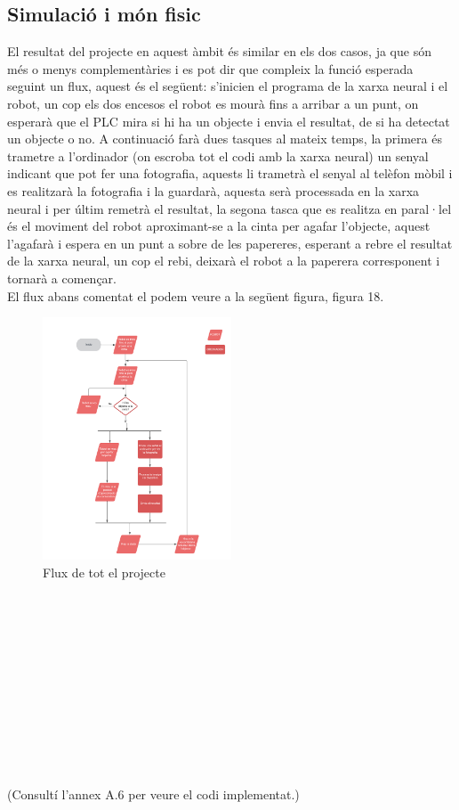 ﻿\documentclass[10pt,a4paper,twocolumn,twoside]{article}
\begin{document}
\subsection{Simulació i món fisic}

El resultat del projecte en aquest àmbit és similar en els dos casos, ja que són més o menys complementàries i es pot dir que compleix la funció esperada seguint un flux, aquest és el següent: s'inicien el programa de la xarxa neural i el robot, un cop els dos encesos el robot es mourà fins a arribar a un punt, on esperarà que el PLC mira si hi ha un objecte i envia el resultat, de si ha detectat un objecte o no. A continuació farà dues tasques al mateix temps, la primera és trametre a l'ordinador (on escroba tot el codi amb la xarxa neural) un senyal indicant que pot fer una fotografia, aquests li trametrà el senyal al telèfon mòbil i es realitzarà la fotografia i la guardarà, aquesta serà processada en la xarxa neural i per últim remetrà el resultat, la segona tasca que es realitza en paral·lel és el moviment del robot aproximant-se a la cinta per agafar l'objecte, aquest l'agafarà i espera en un punt a sobre de les papereres, esperant a rebre el resultat de la xarxa neural, un cop el rebi, deixarà el robot a la paperera corresponent i tornarà a començar.
\\

El flux abans comentat el podem veure a la següent figura, figura 18.
 
 \begin{figure}[!h]
 \centering
    \includegraphics[width=0.5\textwidth]{img/flux.png}
    \caption{Flux de tot el projecte}
\end{figure}
\hfill \break
\\
\\
\\
\\
\\
\\
\\
\\
\\
\\
\\
(Consultí l’annex A.6 per veure el codi implementat.)
\end{document}
